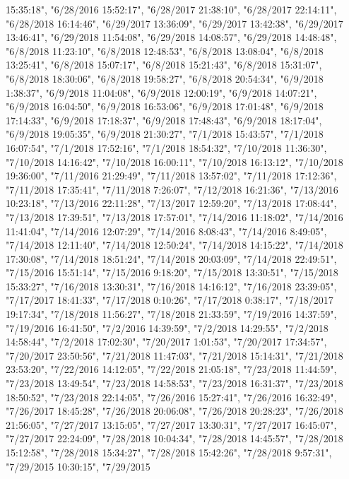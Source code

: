 \documentclass[]{article}
\begin{document}
\begin{itemize}
  15:35:18", "6/28/2016 15:52:17", "6/28/2017 21:38:10", "6/28/2017
  22:14:11", "6/28/2018 16:14:46", "6/29/2017 13:36:09", "6/29/2017
  13:42:38", "6/29/2017 13:46:41", "6/29/2018 11:54:08", "6/29/2018
  14:08:57", "6/29/2018 14:48:48", "6/8/2018 11:23:10", "6/8/2018
  12:48:53", "6/8/2018 13:08:04", "6/8/2018 13:25:41", "6/8/2018
  15:07:17", "6/8/2018 15:21:43", "6/8/2018 15:31:07", "6/8/2018
  18:30:06", "6/8/2018 19:58:27", "6/8/2018 20:54:34", "6/9/2018
  1:38:37", "6/9/2018 11:04:08", "6/9/2018 12:00:19", "6/9/2018
  14:07:21", "6/9/2018 16:04:50", "6/9/2018 16:53:06", "6/9/2018
  17:01:48", "6/9/2018 17:14:33", "6/9/2018 17:18:37", "6/9/2018
  17:48:43", "6/9/2018 18:17:04", "6/9/2018 19:05:35", "6/9/2018
  21:30:27", "7/1/2018 15:43:57", "7/1/2018 16:07:54", "7/1/2018
  17:52:16", "7/1/2018 18:54:32", "7/10/2018 11:36:30", "7/10/2018
  14:16:42", "7/10/2018 16:00:11", "7/10/2018 16:13:12", "7/10/2018
  19:36:00", "7/11/2016 21:29:49", "7/11/2018 13:57:02", "7/11/2018
  17:12:36", "7/11/2018 17:35:41", "7/11/2018 7:26:07", "7/12/2018
  16:21:36", "7/13/2016 10:23:18", "7/13/2016 22:11:28", "7/13/2017
  12:59:20", "7/13/2018 17:08:44", "7/13/2018 17:39:51", "7/13/2018
  17:57:01", "7/14/2016 11:18:02", "7/14/2016 11:41:04", "7/14/2016
  12:07:29", "7/14/2016 8:08:43", "7/14/2016 8:49:05", "7/14/2018
  12:11:40", "7/14/2018 12:50:24", "7/14/2018 14:15:22", "7/14/2018
  17:30:08", "7/14/2018 18:51:24", "7/14/2018 20:03:09", "7/14/2018
  22:49:51", "7/15/2016 15:51:14", "7/15/2016 9:18:20", "7/15/2018
  13:30:51", "7/15/2018 15:33:27", "7/16/2018 13:30:31", "7/16/2018
  14:16:12", "7/16/2018 23:39:05", "7/17/2017 18:41:33", "7/17/2018
  0:10:26", "7/17/2018 0:38:17", "7/18/2017 19:17:34", "7/18/2018
  11:56:27", "7/18/2018 21:33:59", "7/19/2016 14:37:59", "7/19/2016
  16:41:50", "7/2/2016 14:39:59", "7/2/2018 14:29:55", "7/2/2018
  14:58:44", "7/2/2018 17:02:30", "7/20/2017 1:01:53", "7/20/2017
  17:34:57", "7/20/2017 23:50:56", "7/21/2018 11:47:03", "7/21/2018
  15:14:31", "7/21/2018 23:53:20", "7/22/2016 14:12:05", "7/22/2018
  21:05:18", "7/23/2018 11:44:59", "7/23/2018 13:49:54", "7/23/2018
  14:58:53", "7/23/2018 16:31:37", "7/23/2018 18:50:52", "7/23/2018
  22:14:05", "7/26/2016 15:27:41", "7/26/2016 16:32:49", "7/26/2017
  18:45:28", "7/26/2018 20:06:08", "7/26/2018 20:28:23", "7/26/2018
  21:56:05", "7/27/2017 13:15:05", "7/27/2017 13:30:31", "7/27/2017
  16:45:07", "7/27/2017 22:24:09", "7/28/2018 10:04:34", "7/28/2018
  14:45:57", "7/28/2018 15:12:58", "7/28/2018 15:34:27", "7/28/2018
  15:42:26", "7/28/2018 9:57:31", "7/29/2015 10:30:15", "7/29/2015

\end{itemize}
\end{document}
